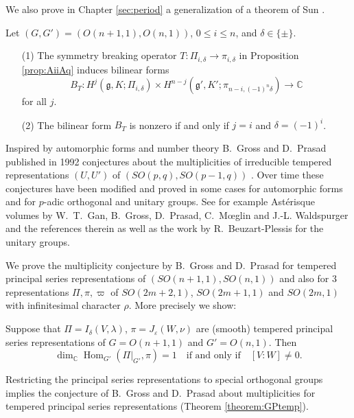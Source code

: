 \medskip
We also prove in Chapter \ref{sec:period} a generalization of a theorem of Sun \cite{S}.  



\begin{theorem}
Let $(G,G')=(O(n+1,1),O(n,1))$, 
 $0 \le i \le n$, 
 and $\delta \in \{ \pm \}$.  
\begin{enumerate}
\item[{\rm{(1)}}]
The symmetry breaking operator
$
  T \colon
  \Pi_{i,\delta} \to \pi_{i,\delta}
$
 in Proposition \ref{prop:AiiAq}
 induces bilinear forms
\[
   B_T \colon 
   H^j({\mathfrak{g}}, K; \Pi_{i,\delta}) 
   \times 
   H^{n-j}({\mathfrak{g}}', K'; \pi_{n-i,(-1)^n \delta})
   \to {\mathbb{C}}
\]
 for all $j$.  
\item[{\rm{(2)}}]
The bilinear form $B_T$ is nonzero
 if and only if $j=i$ and $\delta=(-1)^i$.  

\end{enumerate}
\end{theorem}



\bigskip


Inspired by automorphic forms and number theory B.~Gross and D.~Prasad published  in  1992 conjectures about the multiplicities of irreducible tempered representations $(U,U')$ of $(SO(p,q), SO(p-1,q))$ \cite{GP}.  
Over time these conjectures have been modified and proved
 in some cases for automorphic forms
 and for $p$-adic orthogonal and unitary groups. See for example  Ast\'{e}risque volumes \cite{A1, A2}
 by W.~T.~Gan, B.~Gross, D.~Prasad, C.~M{\oe}glin and J.-L. Waldspurger 
 and the references therein as well as the work
 by R.~Beuzart-Plessis \cite{raphael} for the unitary groups.

We prove the multiplicity conjecture by B.~Gross and D.~Prasad for  tempered principal series representations of $(SO(n+1,1), SO(n,1))$  and also for 3 representations $\Pi, \pi, \varpi$
 of $SO(2m+2,1)$, $SO(2m+1,1)$ and $SO(2m,1)$ with infinitesimal character $\rho$.
More precisely we show:

\begin{theorem}
Suppose that  
 $\Pi= I_\delta (V,\lambda)$, $\pi=J_\varepsilon(W,\nu )$ are (smooth) tempered principal series representations of $G=O(n+1,1)$ and $G'=O(n,1)$. 
Then
\[ {\operatorname{dim}}_{\mathbb{C}} {\operatorname{Hom}}_{G'}
   (\Pi|_{G'},\pi)  = 1  
\quad
\text{if and only if} 
\quad
  [V:W] \ne 0.
\] 
\end{theorem}
Restricting the principal series representations  to special orthogonal groups implies the conjecture of B.~Gross and D.~Prasad about multiplicities 
for tempered principal series representations
 (Theorem \ref{theorem:GPtemp}).



